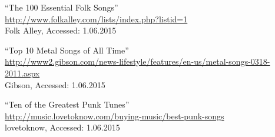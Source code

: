``The 100 Essential Folk Songs'' \\
\url{http://www.folkalley.com/lists/index.php?listid=1} \\
Folk Alley, Accessed: 1.06.2015

``Top 10 Metal Songs of All Time'' \\
\url{http://www2.gibson.com/news-lifestyle/features/en-us/metal-songs-0318-2011.aspx} \\
Gibson, Accessed: 1.06.2015

``Ten of the Greatest Punk Tunes'' \\
\url{http://music.lovetoknow.com/buying-music/best-punk-songs} \\
lovetoknow, Accessed: 1.06.2015


